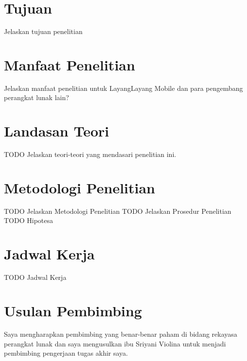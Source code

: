 \documentclass[a4paper, 12pt]{report}
\begin{document}
\section*{Tujuan}
\begin{flushleft}
Jelaskan tujuan penelitian
\end{flushleft}

\section*{Manfaat Penelitian}
\begin{flushleft}
Jelaskan manfaat penelitian untuk LayangLayang Mobile dan para pengembang perangkat lunak lain?
\end{flushleft}

\section*{Landasan Teori}
\begin{flushleft}
TODO Jelaskan teori-teori yang mendasari penelitian ini.
\end{flushleft}

\section*{Metodologi Penelitian}
\begin{flushleft}
TODO Jelaskan Metodologi Penelitian
TODO Jelaskan Prosedur Penelitian
TODO Hipotesa
\end{flushleft}

\section*{Jadwal Kerja}
\begin{flushleft}
TODO Jadwal Kerja
\end{flushleft}

\section*{Usulan Pembimbing}
Saya mengharapkan pembimbing yang benar-benar paham di bidang rekayasa perangkat lunak dan saya mengusulkan ibu Sriyani Violina untuk menjadi pembimbing pengerjaan tugas akhir saya.\cite{lamport94}
\end{document}
